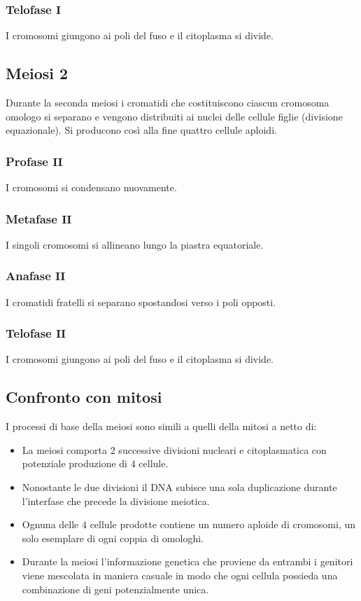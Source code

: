 \subsubsection{Telofase $\mathbf{I}$}
I cromosomi giungono ai poli del fuso e il citoplasma si divide.
\subsection{Meiosi $\mathbf{2}$}
Durante la seconda meiosi i cromatidi che costituiscono ciascun cromosoma omologo si separano e vengono distribuiti ai nuclei delle cellule figlie (divisione equazionale). Si producono
cos\`i alla fine quattro cellule aploidi. 
\subsubsection{Profase $\mathbf{II}$}
I cromosomi si condensano nuovamente. 
\subsubsection{Metafase $\mathbf{II}$}
I singoli cromosomi si allineano lungo la piastra equatoriale. 
\subsubsection{Anafase $\mathbf{II}$}
I cromatidi fratelli si separano spostandosi verso i poli opposti. 
\subsubsection{Telofase $\mathbf{II}$}
I cromosomi giungono ai poli del fuso e il citoplasma si divide. 
\subsection{Confronto con mitosi}
I processi di base della meiosi sono simili a quelli della mitosi a netto di:
\begin{itemize}
	\item La meiosi comporta $2$ successive divisioni nucleari e citoplasmatica con potenziale produzione di $4$ cellule. 
	\item Nonostante le due divisioni il DNA subisce una sola duplicazione durante l'interfase che precede la divisione meiotica. 
	\item Ognuna delle $4$ cellule prodotte contiene un numero aploide di cromosomi, un solo esemplare di ogni coppia di omologhi. 
	\item Durante la meiosi l'informazione genetica che proviene da entrambi i genitori viene mescolata in maniera casuale in modo che ogni cellula possieda una combinazione di geni
		potenzialmente unica. 
\end{itemize}

